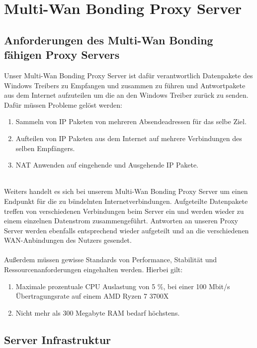 \chapter{Multi-Wan Bonding Proxy Server}
\label{cha:Server}

\section{Anforderungen des Multi-Wan Bonding fähigen Proxy Servers}
Unser Multi-Wan Bonding Proxy Server ist dafür verantwortlich Datenpakete des Windows Treibers zu Empfangen und zusammen zu führen und Antwortpakete aus dem Internet aufzuteilen um die an den Windows Treiber zurück zu senden. Dafür müssen Probleme gelöst werden:
\\
\begin{enumerate}
    \item Sammeln von IP Paketen von mehreren Absendeadressen für das selbe Ziel.
    \item Aufteilen von IP Paketen aus dem Internet auf mehrere Verbindungen des selben Empfängers.
    \item NAT Anwenden auf eingehende und Ausgehende IP Pakete.
\end{enumerate}
\ \\
Weiters handelt es sich bei unserem Multi-Wan Bonding Proxy Server um einen Endpunkt für die zu bündelnten Internetverbindungen. Aufgeteilte Datenpakete treffen von verschiedenen Verbindungen beim Server ein und werden wieder zu einem einzelnen Datenstrom zusammengeführt. Antworten an unseren Proxy Server werden ebenfalls entsprechend wieder aufgeteilt und an die verschiedenen WAN-Anbindungen des Nutzers gesendet. 
\\\\
Außerdem müssen gewisse Standards von Performance, Stabilität und Ressourcenanforderungen eingehalten werden. Hierbei gilt:
\\
\begin{enumerate}
    \item Maximale prozentuale CPU Auslastung von 5 {\%}, bei einer 100 Mbit/s Übertragungsrate auf einem AMD Ryzen 7 3700X
    \item Nicht mehr als 300 Megabyte RAM bedarf höchstens.
\end{enumerate}

\section{Server Infrastruktur}
